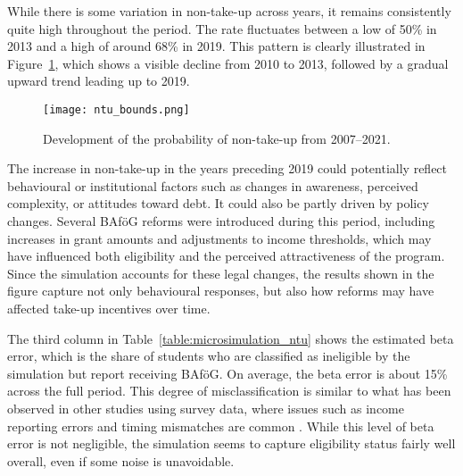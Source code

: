 


While there is some variation in non-take-up across years, it remains consistently quite high throughout the period. 
The rate fluctuates between a low of 50\% in 2013 and a high of around 68\% in 2019. 
This pattern is clearly illustrated in Figure~\ref{fig:ntu_bounds_over_years}, which shows a visible decline from 2010 to 2013, followed by a gradual upward trend leading up to 2019. 

\begin{figure}[htbp]
  \centering
  \texttt{[image: ntu\_bounds.png]}
  \caption{Development of the probability of non-take-up from 2007--2021.}
  \label{fig:ntu_bounds_over_years}
\end{figure}

The increase in non-take-up in the years preceding 2019 could potentially reflect behavioural or institutional factors such as changes in awareness, perceived complexity, or attitudes toward debt. 
It could also be partly driven by policy changes. 
Several BAföG reforms were introduced during this period, including increases in grant amounts and adjustments to income thresholds, which may have influenced both eligibility and the perceived attractiveness of the program. 
Since the simulation accounts for these legal changes, the results shown in the figure capture not only behavioural responses, but also how reforms may have affected take-up incentives over time.


The third column in Table~\ref{table:microsimulation_ntu} shows the estimated beta error, which is the share of students who are classified as ineligible by the simulation but report receiving BAföG. 
On average, the beta error is about 15\% across the full period. 
This degree of misclassification is similar to what has been observed in other studies using survey data, where issues such as income reporting errors and timing mismatches are common \citep{frick_claim_2007}.
While this level of beta error is not negligible, the simulation seems to capture eligibility status fairly well overall, even if some noise is unavoidable.

